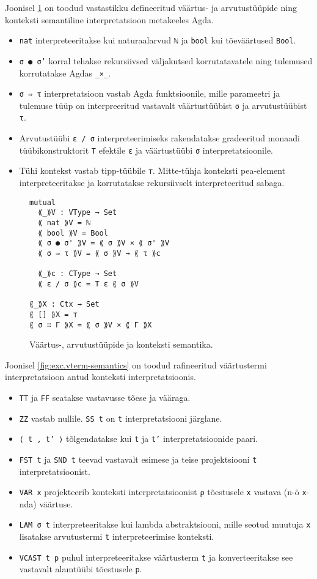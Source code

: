 \documentclass[a4paper,12pt]{article}
\begin{document}
Joonisel \ref{fig:type-semantics} on toodud vastastikku defineeritud väärtus- ja arvutustüüpide ning konteksti semantiline interpretatsioon metakeeles Agda.
\begin{itemize}
\item {\tt nat} interpreteeritakse kui naturaalarvud {\tt ℕ} ja {\tt bool} kui tõeväärtused {\tt Bool}.
\item {\tt σ ● σ'} korral tehakse rekursiivsed väljakutsed korrutatavatele ning tulemused korrutatakse Agdas {\tt _×_}.
\item {\tt σ ⇒ τ} interpretatsioon vastab Agda funktsioonile, mille parameetri ja tulemuse tüüp on interpreeritud vastavalt väärtustüübist {\tt σ} ja arvutustüübist {\tt τ}.
\item Arvutustüübi {\tt ε / σ} interpreteerimiseks rakendatakse gradeeritud monaadi tüübikonstruktorit {\tt T} efektile {\tt ε} ja väärtustüübi {\tt σ} interpretatsioonile.
\item Tühi kontekst vastab tipp-tüübile {\tt ⊤}. Mitte-tühja konteksti pea-element interpreteeritakse ja korrutatakse rekursiivselt interpreteeritud sabaga.
\end{itemize}

\begin{figure}
  \begin{BVerbatim}
mutual
  ⟪_⟫V : VType → Set
  ⟪ nat ⟫V = ℕ
  ⟪ bool ⟫V = Bool
  ⟪ σ ● σ' ⟫V = ⟪ σ ⟫V × ⟪ σ' ⟫V
  ⟪ σ ⇒ τ ⟫V = ⟪ σ ⟫V → ⟪ τ ⟫c

  ⟪_⟫c : CType → Set
  ⟪ ε / σ ⟫c = T ε ⟪ σ ⟫V

⟪_⟫X : Ctx → Set
⟪ [] ⟫X = ⊤
⟪ σ ∷ Γ ⟫X = ⟪ σ ⟫V × ⟪ Γ ⟫X
  \end{BVerbatim}
  \caption{Väärtus-, arvutustüüpide ja konteksti semantika.}
  \label{fig:type-semantics}
\end{figure}

Joonisel \ref{fig:exc.vterm-semantics} on toodud rafineeritud väärtustermi interpretatsioon antud konteksti interpretatsioonis.
\begin{itemize}
\item {\tt TT} ja {\tt FF} seatakse vastavusse tõese ja vääraga.
\item {\tt ZZ} vastab nullile. {\tt SS t} on {\tt t} interpretatsiooni järglane.
\item {\tt ⟨ t , t' ⟩} tõlgendatakse kui {\tt t} ja {\tt t'} interpretatsioonide paari.
\item {\tt FST t} ja {\tt SND t} teevad vastavalt esimese ja teise projektsiooni {\tt t} interpretatsioonist.
\item {\tt VAR x} projekteerib konteksti interpretatsioonist {\tt ρ} tõestusele {\tt x} vastava (n-ö {\tt x}-nda) väärtuse.
\item {\tt LAM σ t} interpreteeritakse kui lambda abstraktsiooni, mille seotud muutuja {\tt x} lisatakse arvutustermi {\tt t} interpreteerimise konteksti.
\item {\tt VCAST t p} puhul interpreteeritakse väärtusterm {\tt t} ja konverteeritakse see vastavalt alamtüübi tõestusele {\tt p}.
\end{itemize}
\end{document}
